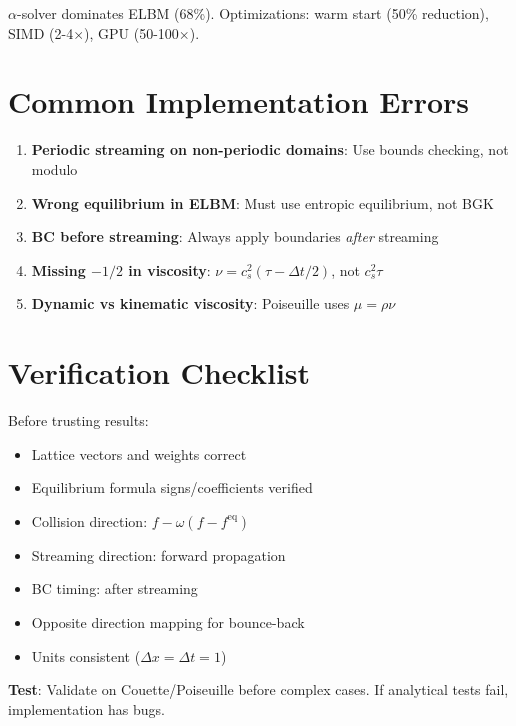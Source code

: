 $\alpha$-solver dominates ELBM (68\%). Optimizations: warm start (50\% reduction), SIMD (2-4$\times$), GPU (50-100$\times$).

\section{Common Implementation Errors}

\begin{enumerate}
    \item \textbf{Periodic streaming on non-periodic domains}: Use bounds checking, not modulo
    \item \textbf{Wrong equilibrium in ELBM}: Must use entropic equilibrium, not BGK
    \item \textbf{BC before streaming}: Always apply boundaries \emph{after} streaming
    \item \textbf{Missing $-1/2$ in viscosity}: $\nu = c_s^2(\tau - \Delta t/2)$, not $c_s^2\tau$
    \item \textbf{Dynamic vs kinematic viscosity}: Poiseuille uses $\mu = \rho\nu$
\end{enumerate}

\section{Verification Checklist}

Before trusting results:
\begin{itemize}
    \item Lattice vectors and weights correct
    \item Equilibrium formula signs/coefficients verified
    \item Collision direction: $f - \omega(f - f^{\mathrm{eq}})$
    \item Streaming direction: forward propagation
    \item BC timing: after streaming
    \item Opposite direction mapping for bounce-back
    \item Units consistent ($\Delta x = \Delta t = 1$)
\end{itemize}

\textbf{Test}: Validate on Couette/Poiseuille before complex cases. If analytical tests fail, implementation has bugs.
